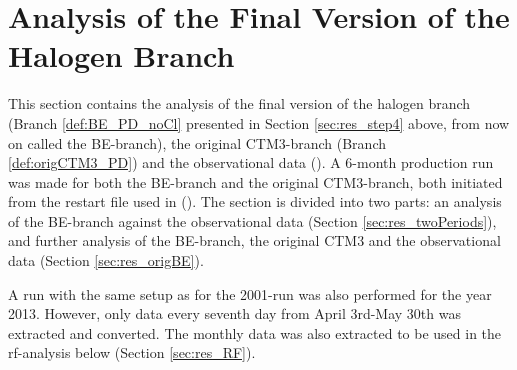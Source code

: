 









\clearpage

\section{Analysis of the Final Version of the Halogen Branch}\label{sec:res_final_Version}

This section contains the analysis of the final version of the halogen branch (Branch \ref{def:BE_PD_noCl} presented in Section \ref{sec:res_step4} above, from now on called the BE-branch), the original CTM3-branch (Branch \ref{def:origCTM3_PD}) and the observational data (\cite{EBAS}). A 6-month production run was made for both the BE-branch and the original CTM3-branch, both initiated from the restart file used in  (\cite{Falk_2019}). The section is divided into two parts: an analysis of the BE-branch against the observational data (Section \ref{sec:res_twoPeriods}), and further analysis of the BE-branch, the original CTM3 and the observational data (Section \ref{sec:res_origBE}).

\medskip

A run with the same setup as for the 2001-run was also performed for the year 2013. However, only data every seventh day from April 3rd-May 30th was extracted and converted. The monthly data was also extracted to be used in the \acrfull{rf}-analysis below (Section \ref{sec:res_RF}). 

